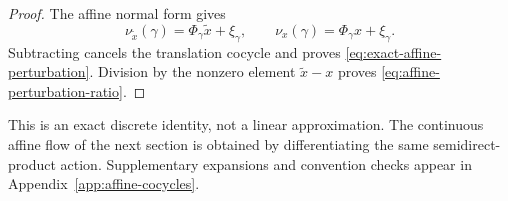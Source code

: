 \begin{proof}
The affine normal form gives
\[
  \nu_{\widetilde x}(\gamma)=\Phi_\gamma\widetilde x+\xi_\gamma,
  \qquad
  \nu_x(\gamma)=\Phi_\gamma x+\xi_\gamma.
\]
Subtracting cancels the translation cocycle and proves
\eqref{eq:exact-affine-perturbation}.  Division by the nonzero element
$\widetilde x-x$ proves \eqref{eq:affine-perturbation-ratio}.
\end{proof}

This is an exact discrete identity, not a linear approximation.  The
continuous affine flow of the next section is obtained by differentiating the
same semidirect-product action.  Supplementary expansions and convention
checks appear in Appendix~\ref{app:affine-cocycles}.
